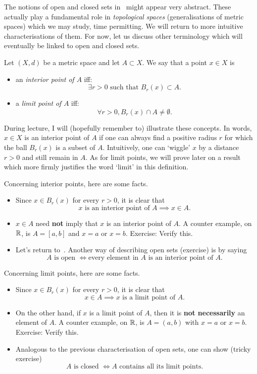 The notions of open and closed sets in~ might appear very abstract. These actually play a fundamental role in \textit{topological spaces} (generalisations of metric spaces) which we may study, time permitting. We will return to more intuitive characterisations of them. For now, let us discuss other terminology which will eventually be linked to open and closed sets.
\begin{defn}
	\label{defn:int_lim_pts}
Let $(X,d)$ be a metric space and let $A\subset X$. We say that a point $x\in X$ is
\begin{itemize}
	\item an \textit{interior point of $A$} iff:
	\[
	\exists r>0\text{ such that }B_r(x) \subset A.
	\]
	\item a \textit{limit point of $A$} iff:
	\[
	\forall r>0, B_r(x) \cap A \neq \emptyset.
	\]
\end{itemize}
\end{defn}
During lecture, I will (hopefully remember to) illustrate these concepts. In words, $x\in X$ is an interior point of $A$ if one can always find a positive radius $r$ for which the ball $B_r(x)$ is a subset of $A$. Intuitively, one can `wiggle' $x$ by a distance $r>0$ and still remain in $A$. As for limit points, we will prove later on a result which more firmly justifies the word `limit' in this definition.
\begin{rem}
	\label{rem:int_lim_pts}
	Concerning interior points, here are some facts.
	\begin{itemize}
		\item Since $x \in B_r(x)$ for every $r>0$, it is clear that
		\[
		x\text{ is an interior point of }A\implies x\in A.
		\]
		\item $x\in A$ need \textbf{not} imply that $x$ is an interior point of $A$. A counter example, on $\mathbb{R}$, is $A = [a,b]$ and $x = a$ or $x=b$. Exercise: Verify this.
		\item Let's return to~. Another way of describing open sets (exercise) is by saying
		\[
		A\text{ is open }\iff \text{every element in $A$ is an interior point of $A$}.
		\]
	\end{itemize}
	Concerning limit points, here are some facts.
	\begin{itemize}
		\item Since $x\in B_r(x)$ for every $r>0$, it is clear that
		\[
		x\in A \implies x\text{ is a limit point of $A$}.
		\]
		\item On the other hand, if $x$ is a limit point of $A$, then it is \textbf{not necessarily} an element of $A$. A counter example, on $\mathbb{R}$, is $A = (a,b)$ with $x = a$ or $x=b$. Exercise: Verify this.
		\item Analogous to the previous characterisation of open sets, one can show (tricky exercise)
		\[
		A\text{ is closed }\iff A\text{ contains all its limit points.}
		\]
	\end{itemize}
\end{rem}
